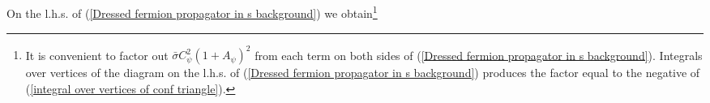 \documentclass[aps,amsmath,amssymb,prd,showpacs,floatfix,preprint,superscriptaddress,nofootinbib,12pt]{article}
\begin{document}
\begin{center}
\begin{equation}
  \begin{picture}(500,50) (6,120)
    \SetWidth{1.0}
    \SetColor{Black}
    \Text(82,177)[lb]{\scalebox{1.001}{$\bar \sigma$}}
    \Text(62,157)[lb]{\scalebox{0.6}{$2\alpha$}}
    \Text(100,157)[lb]{\scalebox{0.6}{$2\alpha$}}
    \Text(82,132)[lb]{\scalebox{0.6001}{$2\beta$}}
    \Vertex(85,167){4}
    \Line[arrow,arrowpos=0.5,arrowlength=5,arrowwidth=2,arrowinset=0.2](85,167)(65,140)
    \Vertex(65,140){4}
    \Line[arrow,arrowpos=0.5,arrowlength=5,arrowwidth=2,arrowinset=0.2](104,141)(85,167)
    \Vertex(104,141){4}
    \Line[](66,141)(104,141)
    \Line[arrow,arrowpos=0.5,arrowlength=5,arrowwidth=2,arrowinset=0.2](65,140)(38,122)
    \Line[arrow,arrowpos=0.5,arrowlength=5,arrowwidth=2,arrowinset=0.2](130,122)(104,141)
    \Vertex(38,122){2}
    \Vertex(130,122){2}
    \Text(145,147)[lb]{\scalebox{1.001}{$=$}}
    \Text(195,168)[lb]{\scalebox{1}{$\bar \sigma$}}
    \Line[arrow,arrowpos=0.5,arrowlength=5,arrowwidth=2,arrowinset=0.2](197,159)(161,122)
    \Line[arrow,arrowpos=0.5,arrowlength=5,arrowwidth=2,arrowinset=0.2](230,122)(197,159)
    \Vertex(197,159){4}
    \Vertex(161,122){2}
    \Vertex(230,122){2}
    \Text(285,168)[lb]{\scalebox{1.001}{$\bar \sigma$}}
    \Text(230,142)[lb]{\scalebox{1}{$+\frac{\gamma_\sigma}{\delta}~\times$}}
    \Line[arrow,arrowpos=0.5,arrowlength=5,arrowwidth=2,arrowinset=0.2](287,159)(252,122)
    \Line[arrow,arrowpos=0.5,arrowlength=5,arrowwidth=2,arrowinset=0.2](321,122)(287,159)
    \Vertex(252,122){2}
    \Vertex(321,122){2}
    \Vertex(287,159){4}
    \Text(390,178)[lb]{\scalebox{1}{$\bar \sigma$}}
    \Text(331,145.5)[lb]{\scalebox{1}{$+$}}
    \Text(381,131)[lb]{\scalebox{0.6}{$2\Delta_\sigma+\delta$}}
    \Vertex(392,169){4}
    \Line[arrow,arrowpos=0.5,arrowlength=5,arrowwidth=2,arrowinset=0.2](392,169)(373,141)
    \Line[arrow,arrowpos=0.5,arrowlength=5,arrowwidth=2,arrowinset=0.2](412,141)(392,169)
    \Line[](373,141)(412,141)
    \Vertex(373,141){4}
    \Vertex(412,141){4}
    \Line[arrow,arrowpos=0.5,arrowlength=5,arrowwidth=2,arrowinset=0.2](373,141)(345,122)
    \Line[arrow,arrowpos=0.5,arrowlength=5,arrowwidth=2,arrowinset=0.2](438,122)(412,141)
    \Vertex(345,122){2}
    \Vertex(438,122){2}
  \end{picture}
   \label{Dressed fermion propagator in s background}
\end{equation}
\end{center}
On the l.h.s. of (\ref{Dressed fermion propagator in s background}) we obtain\footnote{It is convenient
to factor out $\bar\sigma C_\psi^2(1{+}A_\psi)^2$ from each term on both sides of (\ref{Dressed fermion propagator in s background}). Integrals over vertices
of the diagram on the l.h.s. of (\ref{Dressed fermion propagator in s background}) produces the factor equal to the negative of (\ref{integral over vertices of conf triangle}).}
\end{document}
